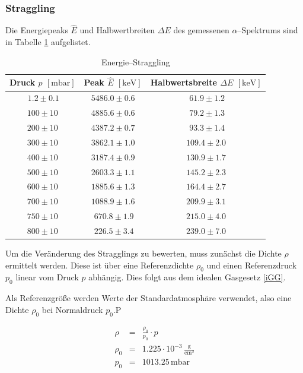 \documentclass[12pt,a4paper]{scrartcl}
\numberwithin{equation}{section} %
\begin{document}
\hypertarget{energiestraggling-straggling}{%
	\subsubsection{Straggling}\label{energiestraggling-straggling}}
Die Energiepeaks $\hat E$ und Halbwertbreiten $\Delta E$ des gemessenen $\alpha$--Spektrums sind in Tabelle \ref{tabelle: Straggling} aufgelistet.
\begin{table}
	\centering
	\begin{tabular}[h]{||c|c|c||}
		\hline
		Druck $p$ $[\mathrm{mbar}]$ & Peak $\hat E$ $[\mathrm{keV}]$ & Halbwertsbreite $\Delta E$ $[\mathrm{keV}]$  \\
		\hline\hline
		$\ 1.2 \pm 0.1$ & $5486.0 \pm 0.6$ & $\ 61.9 \pm 1.2$ \\
		\hline
		$100 \pm 10$ & $4885.6 \pm 0.6$ & $\ 79.2 \pm 1.3$ \\
		\hline
		$200 \pm 10$ & $4387.2 \pm 0.7$ & $\ 93.3 \pm 1.4$ \\
		\hline
		$300 \pm 10$ & $3862.1 \pm 1.0$ & $109.4 \pm 2.0$ \\
		\hline
		$400 \pm 10$ & $3187.4 \pm 0.9$ & $130.9 \pm 1.7$ \\
		\hline
		$500 \pm 10$ & $2603.3 \pm 1.1$ & $145.2 \pm 2.3$ \\
		\hline
		$600 \pm 10$ & $1885.6 \pm 1.3$ & $164.4 \pm 2.7$ \\
		\hline
		$700 \pm 10$ & $1088.9 \pm 1.6$ & $209.9 \pm 3.1$ \\
		\hline
		$750 \pm 10$ & $\ 670.8 \pm 1.9$ & $215.0 \pm 4.0$ \\
		\hline
		$800 \pm 10$ & $\ 226.5 \pm 3.4$ & $239.0 \pm 7.0$ \\
		\hline
	\end{tabular}
	\caption{Energie--Straggling}
	\label{tabelle: Straggling}
\end{table}

Um die Veränderung des Stragglings zu bewerten, muss zunächst die Dichte $\rho$ ermittelt werden. Diese ist über eine Referenzdichte $\rho_0$ und einen Referenzdruck $p_0$ linear vom Druck $p$ abhängig.  Dies folgt aus dem idealen Gasgesetz \eqref{iGG}.

Als Referenzgröße werden Werte der Standardatmosphäre verwendet, also eine Dichte $\rho_0$ bei Normaldruck $p_0$.P

\begin{eqnarray}
	\rho &=& \frac{\rho_0}{p_0} \cdot p \\
	\rho_0 &=& 1.225 \cdot 10^{-3}\mathrm{\,\frac{g}{cm^3}} \label{eq:Normaldichte Luft} \\
	p_0 &=& 1013.25 \mathrm{\,mbar} \label{eq:Normaldruck Luft}
\end{eqnarray}
\end{document}
